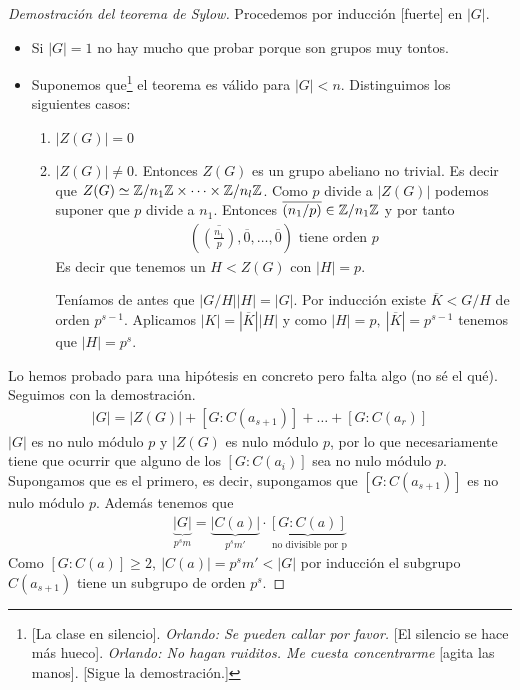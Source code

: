 \begin{proof}[Demostración del teorema de Sylow]
	Procedemos por inducción [fuerte] en $|G|$.
	\begin{itemize}
		\item Si $|G| = 1$ no hay mucho que probar porque son grupos muy tontos.
		\item Suponemos que\footnote{[La clase en silencio]. \textit{Orlando: Se pueden callar por favor.} [El silencio se hace más hueco]. \textit{Orlando: No hagan ruiditos. Me cuesta concentrarme} [agita las manos]. [Sigue la demostración.]} el teorema es válido para $|G| < n$. Distinguimos los siguientes casos:
		\begin{enumerate}
			\item $|Z(G)| = 0$
			\item $|Z(G)| \neq 0$. Entonces $Z(G)$ es un grupo abeliano no trivial. Es decir que $Z(G) \simeq \mathbb{Z}/n_1\mathbb{Z} \times \dots \times \mathbb{Z}/n_l\mathbb{Z}$. Como $p$ divide a $|Z(G)|$ podemos suponer que $p$ divide a $n_1$. Entonces $\overline{(n_1/p)} \in \mathbb{Z}/n_1\mathbb{Z}$ y por tanto
			\begin{align*}
				(\overline{\left(\frac{n_1}{p}\right)}, \overline{0}, \dots, \overline{0}) \text{ tiene orden } p
			\end{align*}
			Es decir que tenemos un $H < Z(G)$ con $|H| = p$.
			
			Teníamos de antes que $|G/H| |H| = |G|$. Por inducción existe $\overline{K} < G/H$ de orden $p^{s-1}$. Aplicamos $|K| = |\overline{K}||H|$ y como $|H| = p,\ |\overline{K}| = p^{s-1}$ tenemos que $|H| = p^s$.
		\end{enumerate}
	\end{itemize}

	Lo hemos probado para una hipótesis en concreto pero falta algo (no sé el qué). Seguimos con la demostración.
	\begin{align*}
		|G| = |Z(G)| + [G:C(a_{s+1})] + \dots  + [G:C(a_r)]
	\end{align*}
	$|G|$ es no nulo módulo $p$ y $|Z(G)$ es nulo módulo $p$, por lo que necesariamente tiene que ocurrir que alguno de los $[G:C(a_i)]$ sea no nulo módulo $p$. Supongamos que es el primero, es decir, supongamos que $[G:C(a_{s+1})]$ es no nulo módulo $p$. Además tenemos que
	\begin{align*}
		\underbrace{|G|}_{p^sm} = \underbrace{|C(a)|}_{p^sm'}\cdot \underbrace{[G:C(a)]}_{\text{ no divisible por p}}
	\end{align*}
	Como $[G:C(a)] \geq 2,\ |C(a)| = p^sm' < |G|$ por inducción el subgrupo $C(a_{s+1})$ tiene un subgrupo de orden $p^s$.
\end{proof}
